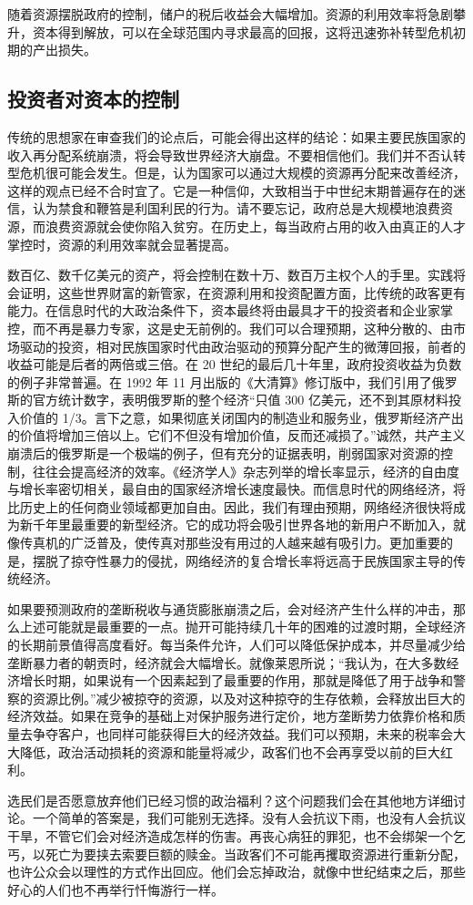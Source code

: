随着资源摆脱政府的控制，储户的税后收益会大幅增加。资源的利用效率将急剧攀升，资本得到解放，可以在全球范围内寻求最高的回报，这将迅速弥补转型危机初期的产出损失。

\subsection{投资者对资本的控制}
传统的思想家在审查我们的论点后，可能会得出这样的结论：如果主要民族国家的收入再分配系统崩溃，将会导致世界经济大崩盘。不要相信他们。我们并不否认转型危机很可能会发生。但是，认为国家可以通过大规模的资源再分配来改善经济，这样的观点已经不合时宜了。它是一种信仰，大致相当于中世纪末期普遍存在的迷信，认为禁食和鞭笞是利国利民的行为。请不要忘记，政府总是大规模地浪费资源，而浪费资源就会使你陷入贫穷。在历史上，每当政府占用的收入由真正的人才掌控时，资源的利用效率就会显著提高。

数百亿、数千亿美元的资产，将会控制在数十万、数百万主权个人的手里。实践将会证明，这些世界财富的新管家，在资源利用和投资配置方面，比传统的政客更有能力。在信息时代的大政治条件下，资本最终将由最具才干的投资者和企业家掌控，而不再是暴力专家，这是史无前例的。我们可以合理预期，这种分散的、由市场驱动的投资，相对民族国家时代由政治驱动的预算分配产生的微薄回报，前者的收益可能是后者的两倍或三倍。在 20 世纪的最后几十年里，政府投资收益为负数的例子非常普遍。在 1992 年 11 月出版的《大清算》修订版中，我们引用了俄罗斯的官方统计数字，表明俄罗斯的整个经济“只值 300 亿美元，还不到其原材料投入价值的 1/3。言下之意，如果彻底关闭国内的制造业和服务业，俄罗斯经济产出的价值将增加三倍以上。它们不但没有增加价值，反而还减损了。”诚然，共产主义崩溃后的俄罗斯是一个极端的例子，但有充分的证据表明，削弱国家对资源的控制，往往会提高经济的效率。《经济学人》杂志列举的增长率显示，经济的自由度与增长率密切相关，最自由的国家经济增长速度最快。而信息时代的网络经济，将比历史上的任何商业领域都更加自由。因此，我们有理由预期，网络经济很快将成为新千年里最重要的新型经济。它的成功将会吸引世界各地的新用户不断加入，就像传真机的广泛普及，使传真对那些没有用过的人越来越有吸引力。更加重要的是，摆脱了掠夺性暴力的侵扰，网络经济的复合增长率将远高于民族国家主导的传统经济。

如果要预测政府的垄断税收与通货膨胀崩溃之后，会对经济产生什么样的冲击，那么上述可能就是最重要的一点。抛开可能持续几十年的困难的过渡时期，全球经济的长期前景值得高度看好。每当条件允许，人们可以降低保护成本，并尽量减少给垄断暴力者的朝贡时，经济就会大幅增长。就像莱恩所说；“我认为，在大多数经济增长时期，如果说有一个因素起到了最重要的作用，那就是降低了用于战争和警察的资源比例。”减少被掠夺的资源，以及对这种掠夺的生存依赖，会释放出巨大的经济效益。如果在竞争的基础上对保护服务进行定价，地方垄断势力依靠价格和质量去争夺客户，也同样可能获得巨大的经济效益。我们可以预期，未来的税率会大大降低，政治活动损耗的资源和能量将减少，政客们也不会再享受以前的巨大红利。

选民们是否愿意放弃他们已经习惯的政治福利？这个问题我们会在其他地方详细讨论。一个简单的答案是，我们可能别无选择。没有人会抗议下雨，也没有人会抗议干旱，不管它们会对经济造成怎样的伤害。再丧心病狂的罪犯，也不会绑架一个乞丐，以死亡为要挟去索要巨额的赎金。当政客们不可能再攫取资源进行重新分配，也许公众会以理性的方式作出回应。他们会忘掉政治，就像中世纪结束之后，那些好心的人们也不再举行忏悔游行一样。